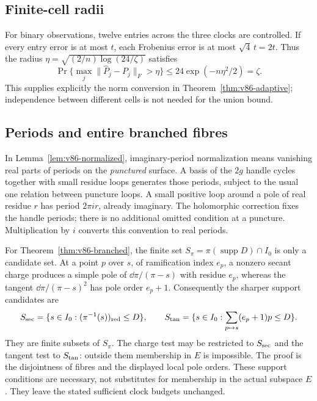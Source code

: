 \subsection{Finite-cell radii}
For binary observations, twelve entries across the three clocks are
controlled. If every entry error is at most $t$, each Frobenius error
is at most $\sqrt4\,t=2t$. Thus the radius
$\eta=\sqrt{(2/n)\log(24/\zeta)}$ satisfies
\[
 \Pr\{\max_j\|\widehat P_j-P_j\|_F>\eta\}
             \le24\exp(-n\eta^2/2)=\zeta.
\]
This supplies explicitly the norm conversion in
Theorem~\ref{thm:v86-adaptive}; independence between different cells
is not needed for the union bound.

\subsection{Periods and entire branched fibres}
In Lemma~\ref{lem:v86-normalized}, imaginary-period normalization
means vanishing real parts of periods on the \emph{punctured}
surface. A basis of the $2g$ handle cycles together with small residue
loops generates those periods, subject to the usual one relation
between puncture loops. A small positive loop around a pole of real
residue $r$ has period $2\pi i r$, already imaginary. The holomorphic
correction fixes the handle periods; there is no additional omitted
condition at a puncture. Multiplication by $i$ converts this convention
to real periods.

For Theorem~\ref{thm:v86-branched}, the finite set
$S_\pi=\pi(\operatorname{supp}D)\cap I_0$ is only a candidate set.
At a point $p$ over $s$, of ramification index $e_p$, a nonzero
secant charge produces a simple pole of $\dd\pi/(\pi-s)$ with
residue $e_p$, whereas the tangent $\dd\pi/(\pi-s)^2$ has pole
order $e_p+1$. Consequently the sharper support candidates are
\[
 S_{\rm sec}=\{s\in I_0: (\pi^{-1}(s))_{\rm red}\le D\},
 \qquad
 S_{\rm tan}=\{s\in I_0:\sum_{p\mapsto s}(e_p+1)p\le D\}.
\]
They are finite subsets of $S_\pi$. The charge test may be restricted
to $S_{\rm sec}$ and the tangent test to $S_{\rm tan}$: outside them
membership in $E$ is impossible. The proof is the disjointness of
fibres and the displayed local pole orders. These support conditions
are necessary, not substitutes for membership in the actual subspace
$E$. They leave the stated sufficient clock budgets unchanged.
